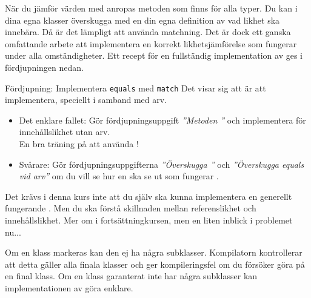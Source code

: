 


\ifkompendium
\noindent När du jämför värden med \code{==} anropas metoden  som finns för alla typer. Du kan i dina egna klasser överskugga  med en din egna definition av vad likhet ska innebära. Då är det lämpligt att använda matchning. Det är dock ett ganska omfattande arbete att implementera en korrekt likhetsjämförelse som fungerar under alla omständigheter. Ett recept för en fullständig implementation av  ges i fördjupningen nedan. 
\fi

\begin{Slide}{Fördjupning: Implementera \texttt{equals} med \texttt{match}}
Det visar sig att  är  att implementera, speciellt  i samband med arv.
\begin{itemize}\SlideFontSmall
\item Det enklare fallet: Gör fördjupningsuppgift \textit{''Metoden ''} och implementera  för innehållslikhet utan arv. \\ En bra träning på att använda !

\item Svårare: Gör fördjupningsuppgifterna  \textit{''Överskugga ''} och \textit{''Överskugga equals vid arv''} om du vill se hur en   ska se ut som fungerar .

\end{itemize}

\noindent Det krävs i denna kurs inte att du själv ska kunna implementera en generellt fungerande . Men du ska förstå skillnaden mellan referenslikhet och innehållslikhet. Mer om  i fortsättningkursen, men en liten inblick i problemet nu...
\end{Slide}

\ifkompendium
\noindent Om en klass markeras  kan den ej ha några subklasser. Kompilatorn kontrollerar att detta gäller alla finala klasser och ger kompileringsfel om du försöker göra  på en final klass. Om en klass garanterat inte har några subklasser kan implementationen av  göra enklare.
\fi 

